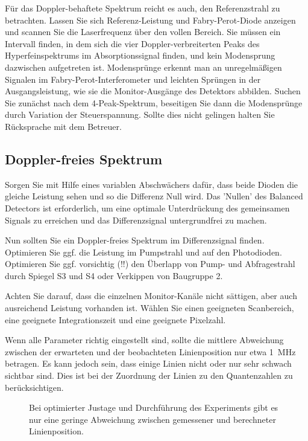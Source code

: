 Für das Doppler-behaftete Spektrum reicht es auch, den Referenzstrahl zu betrachten. Lassen Sie sich Referenz-Leistung und Fabry-Perot-Diode anzeigen und scannen Sie die Laserfrequenz über den vollen Bereich. Sie müssen ein Intervall finden, in dem sich die vier Doppler-verbreiterten  Peaks des Hyperfeinspektrums im Absorptionssignal finden, und kein Modensprung dazwischen aufgetreten ist. Modensprünge erkennt man an unregelmäßigen Signalen im Fabry-Perot-Interferometer und leichten Sprüngen in der Ausgangsleistung, wie sie die Monitor-Ausgänge des Detektors abbilden. Suchen Sie zunächst nach dem 4-Peak-Spektrum, beseitigen Sie dann die Modensprünge durch Variation der Steuerspannung. Sollte dies nicht gelingen halten Sie  Rücksprache mit dem Betreuer.


\subsection{Doppler-freies Spektrum}


Sorgen Sie  mit Hilfe eines variablen Abschwächers dafür, dass beide Dioden die gleiche Leistung sehen und so die Differenz Null wird. Das 'Nullen' des Balanced Detectors ist erforderlich, um eine optimale Unterdrückung des gemeinsamen Signals zu erreichen und das Differenzsignal untergrundfrei zu machen.

Nun sollten Sie ein Doppler-freies Spektrum im  Differenzsignal  finden. Optimieren Sie ggf. die Leistung im Pumpstrahl und auf den Photodioden. Optimieren Sie ggf. vorsichtig (!!) den Überlapp von Pump- und Abfragestrahl durch Spiegel S3 und S4 oder Verkippen von Baugruppe 2.

Achten Sie darauf, dass die einzelnen Monitor-Kanäle nicht sättigen, aber auch ausreichend Leistung vorhanden ist. Wählen Sie einen geeigneten Scanbereich, eine geeignete Integrationszeit und eine geeignete Pixelzahl.

Wenn alle Parameter richtig eingestellt sind, sollte die mittlere Abweichung zwischen der erwarteten und der beobachteten Linienposition nur etwa 1~MHz betragen. Es kann jedoch sein, dass einige Linien nicht oder nur sehr schwach sichtbar sind. Dies ist bei der Zuordnung der Linien zu den Quantenzahlen zu berücksichtigen.


\begin{figure}

	\caption{Bei optimierter Justage und Durchführung des Experiments gibt es nur eine geringe Abweichung zwischen gemessener und berechneter Linienposition.}
	\label{fig:demo_abweichung}
\end{figure}



